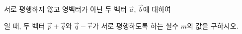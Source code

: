 서로 평행하지 않고 영벡터가 아닌 두 벡터 $\vec{a}$, $\vec{b}$에 대하여 \par\smallskip{}\par\smallskip\noindent 일 때, 두 벡터 $\vec{p}+\vec{q}$와 $\vec{q}-\vec{r}$가 서로 평행하도록 하는 실수 $m$의 값을 구하시오.
